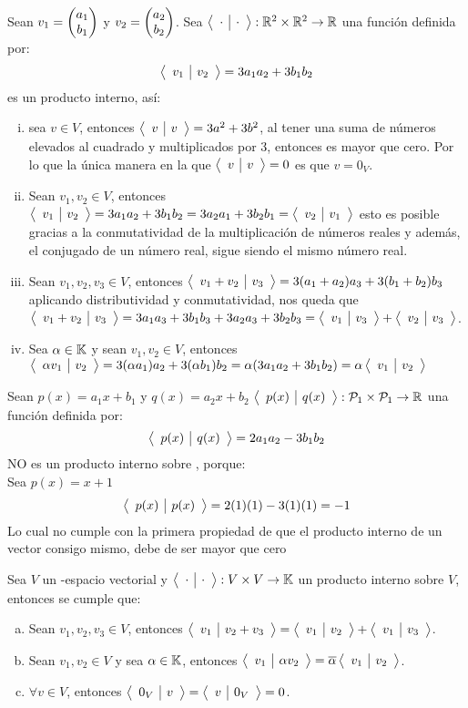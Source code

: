 \begin{ejemplo}
    Sean $v_1 = \vectrdos{a_1}{b_1}$ y $v_2 = \vectrdos{a_2}{b_2}$. Sea $\prodInt{\cdot}{\cdot}: \rdos \times \rdos \to \dobler$ una función definida por: 
    $$\prodInt{v_1}{v_2} = 3a_1a_2 + 3b_1b_2$$
    es un producto interno, así:
    \begin{enumerate}[i.]
        \item sea $v \in V$, entonces
        $\prodInt{v}{v} = 3a^2 + 3b^2$, al tener una suma de números elevados al cuadrado y multiplicados por 3, entonces  es mayor que cero. Por lo que la única manera en la que $\prodInt{v}{v} = 0$ es que $v = 0_V$.
        \item Sean $v_1, v_2 \in V$, entonces $\prodInt{v_1}{v_2} = 3a_1a_2 + 3b_1b_2 = 3a_2a_1 + 3b_2b_1 = \prodInt{v_2}{v_1}$ esto es posible gracias a la conmutatividad de la multiplicación de números reales y además, el conjugado de un número real, sigue siendo el mismo número real.
        \item Sean $v_1, v_2, v_3 \in V$, entonces $\prodInt{v_1 + v_2}{v_3} = 3(a_1 + a_2)a_3 + 3(b_1 + b_2)b_3$ aplicando distributividad y conmutatividad, nos queda que\\
        $\prodInt{v_1 + v_2}{v_3} = 3a_1a_3+ 3b_1b_3+ 3a_2a_3+ 3b_2b_3 = \prodInt{v_1}{v_3} + \prodInt{v_2}{v_3}$.
        \item Sea $\alpha \in \dobleK$ y sean $v_1, v_2 \in V$, entonces $\prodInt{\alpha v_1}{v_2} = 3(\alpha a_1)a_2 + 3(\alpha b_1)b_2 = \alpha(3a_1a_2 + 3b_1b_2) = \alpha \prodInt{v_1}{v_2}$ 
    \end{enumerate}
\end{ejemplo}
\newpage

\begin{ejemplo}
    Sean $p(x) = a_1x+b_1$ y $q(x)= a_2x+b_2$ $\prodInt{p(x)}{q(x)}: \puno \times \puno \to \dobler$ una función definida por:
    $$\prodInt{p(x)}{q(x)} = 2a_1a_2 - 3b_1b_2$$
    NO es un producto interno sobre \puno, porque:\\
    Sea $p(x) = x+1$
    $$\prodInt{p(x)}{p(x)} = 2(1)(1) - 3(1)(1) = -1$$
    Lo cual no cumple con la primera propiedad de que el producto interno de un vector consigo mismo, debe de ser mayor que cero
\end{ejemplo}

\begin{theorem}
Sea $V$ un \dobleK-espacio vectorial y $\prodInt{\cdot}{\cdot}: V \times V \to \dobleK$ un producto interno sobre $V$, entonces se cumple que:
\begin{enumerate}[a.]
    \item Sean $v_1, v_2, v_3 \in V$, entonces $\prodInt{v_1}{v_2 + v_3} = \prodInt{v_1}{v_2} + \prodInt{v_1}{v_3}$.
    \item Sean $v_1, v_2 \in V$ y sea $\alpha \in \dobleK$, entonces $\prodInt{v_1}{\alpha v_2} = \overline{\alpha}\prodInt{v_1}{v_2}$.
    \item $\forall v \in V$, entonces $\prodInt{0_V}{v} = \prodInt{v}{0_V} = 0$.
\end{enumerate}
\end{theorem}

